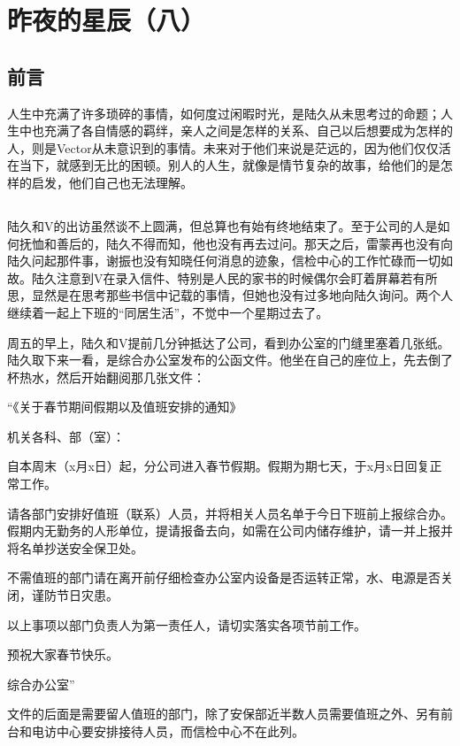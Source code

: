\chapter{昨夜的星辰（八）}

\section*{前言}
人生中充满了许多琐碎的事情，如何度过闲暇时光，是陆久从未思考过的命题；人生中也充满了各自情感的羁绊，亲人之间是怎样的关系、自己以后想要成为怎样的人，则是Vector从未意识到的事情。未来对于他们来说是茫远的，因为他们仅仅活在当下，就感到无比的困顿。别人的人生，就像是情节复杂的故事，给他们的是怎样的启发，他们自己也无法理解。

\lineseparator

\section*{}

陆久和V的出访虽然谈不上圆满，但总算也有始有终地结束了。至于公司的人是如何抚恤和善后的，陆久不得而知，他也没有再去过问。那天之后，雷蒙再也没有向陆久问起那件事，谢振也没有知晓任何消息的迹象，信检中心的工作忙碌而一切如故。陆久注意到V在录入信件、特别是人民的家书的时候偶尔会盯着屏幕若有所思，显然是在思考那些书信中记载的事情，但她也没有过多地向陆久询问。两个人继续着一起上下班的“同居生活”，不觉中一个星期过去了。

周五的早上，陆久和V提前几分钟抵达了公司，看到办公室的门缝里塞着几张纸。陆久取下来一看，是综合办公室发布的公函文件。他坐在自己的座位上，先去倒了杯热水，然后开始翻阅那几张文件：

“《关于春节期间假期以及值班安排的通知》

机关各科、部（室）：

自本周末（x月x日）起，分公司进入春节假期。假期为期七天，于x月x日回复正常工作。

请各部门安排好值班（联系）人员，并将相关人员名单于今日下班前上报综合办。假期内无勤务的人形单位，提请报备去向，如需在公司内储存维护，请一并上报并将名单抄送安全保卫处。

不需值班的部门请在离开前仔细检查办公室内设备是否运转正常，水、电源是否关闭，谨防节日灾患。

以上事项以部门负责人为第一责任人，请切实落实各项节前工作。

预祝大家春节快乐。

综合办公室”

文件的后面是需要留人值班的部门，除了安保部近半数人员需要值班之外、另有前台和电访中心要安排接待人员，而信检中心不在此列。


